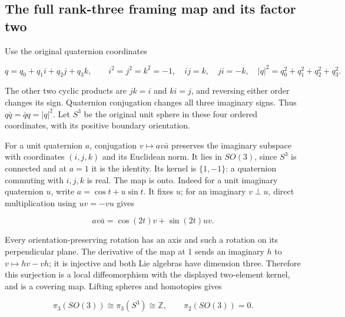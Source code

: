 \subsection{The full rank-three framing map and its factor two}
\label{courseIII:the-original-six-dimensional-framing-invariant:framed-six-rank-three}

\label{courseIII:the-original-six-dimensional-framing-invariant:section-1}\label{courseIII:framed6:1}

Use the original quaternion coordinates

\begin{equation}
q=q_0+q_1i+q_2j+q_3k,\qquad
 i^2=j^2=k^2=-1,\quad ij=k,\quad ji=-k,
 \quad |q|^2=q_0^2+q_1^2+q_2^2+q_3^2.
 \label{courseIII:the-original-six-dimensional-framing-invariant:eq:1.1}
\end{equation}

The other two cyclic products are \(jk=i\) and \(ki=j\), and reversing either order changes its sign. Quaternion conjugation changes all three imaginary signs. Thus \(q\bar q=\bar q q=|q|^2\). Let \(S^3\) be the original unit sphere in these four ordered coordinates, with its positive boundary orientation.

For a unit quaternion \(a\), conjugation \(v\mapsto av\bar a\) preserves the imaginary subspace with coordinates \((i,j,k)\) and its Euclidean norm. It lies in \(SO(3)\), since \(S^3\) is connected and at \(a=1\) it is the identity. Its kernel is \(\{1,-1\}\): a quaternion commuting with \(i,j,k\) is real. The map is onto. Indeed for a unit imaginary quaternion \(u\), write \(a=\cos t+u\sin t\). It fixes \(u\); for an imaginary \(v\perp u\), direct multiplication using \(uv=-vu\) gives

\begin{equation}
a v\bar a=\cos(2t)v+\sin(2t)uv.
 \label{courseIII:the-original-six-dimensional-framing-invariant:eq:1.2}
\end{equation}

Every orientation-preserving rotation has an axis and such a rotation on its perpendicular plane. The derivative of the map at 1 sends an imaginary \(h\) to \(v\mapsto hv-vh\); it is injective and both Lie algebras have dimension three. Therefore this surjection is a local diffeomorphism with the displayed two-element kernel, and is a covering map. Lifting spheres and homotopies gives

\begin{equation}
\pi_3(SO(3))\cong\pi_3(S^3)\cong\mathbb Z,\qquad
 \pi_2(SO(3))=0.
 \label{courseIII:the-original-six-dimensional-framing-invariant:eq:1.3}
\end{equation}

